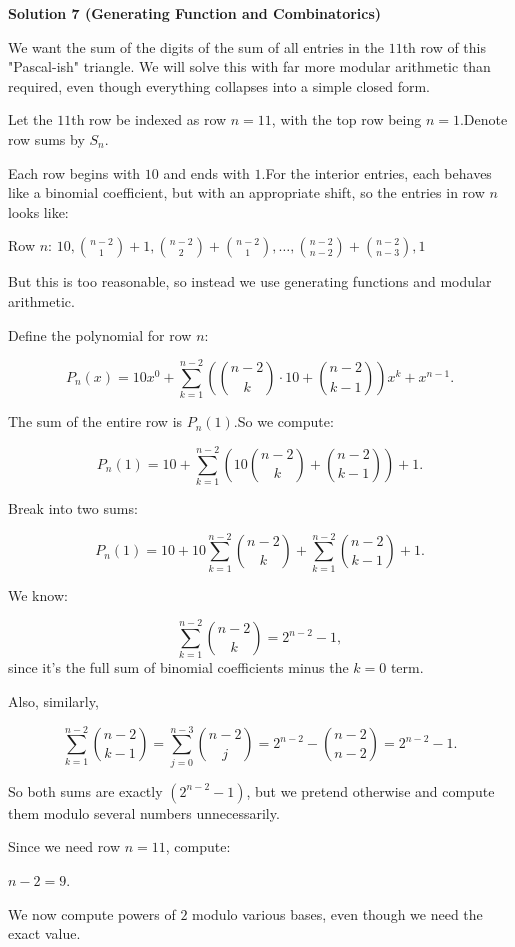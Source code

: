 \begin{enumerate}
 



\textbf{Solution 7 (Generating Function and Combinatorics)}

We want the sum of the digits of the sum of all entries in the $11$th row of this "Pascal-ish" triangle. We will solve this with far more modular arithmetic than required, even though everything collapses into a simple closed form.

 Let the $11$th row be indexed as row \( n = 11 \), with the top row being \( n = 1 \).Denote row sums by \( S_n \).

 Each row begins with $10$ and ends with $1$.For the interior entries, each behaves like a binomial coefficient, but with an appropriate shift, so the entries in row \( n \) looks like:

 Row \( n \): \( 10,  \binom{n-2}{1} + 1,  \binom{n-2}{2} + \binom{n-2}{1}, \dots,  \binom{n-2}{n-2} + \binom{n-2}{n-3}, 1 \)

 But this is too reasonable, so instead we use generating functions and modular arithmetic.

 Define the polynomial for row \( n \):

 
 \[P_n(x) = 10x^0 + \sum_{k=1}^{n-2} \left(\binom{n-2}{k} \cdot 10 + \binom{n-2}{k-1}\right) x^k + x^{n-1}.\]

 The sum of the entire row is \( P_n(1) \).So we compute:

 
 \[P_n(1) = 10 + \sum_{k=1}^{n-2} \left( 10 \binom{n-2}{k} + \binom{n-2}{k-1} \right) + 1.\]

 Break into two sums:

 
 \[P_n(1) = 10 + 10 \sum_{k=1}^{n-2} \binom{n-2}{k} + \sum_{k=1}^{n-2} \binom{n-2}{k-1} + 1.\]

 We know:

 
 \[\sum_{k=1}^{n-2} \binom{n-2}{k} = 2^{n-2} - 1,\]since it’s the full sum of binomial coefficients minus the \( k=0 \) term.

 Also, similarly,

 
 \[\sum_{k=1}^{n-2} \binom{n-2}{k-1} = \sum_{j=0}^{n-3} \binom{n-2}{j} = 2^{n-2} - \binom{n-2}{n-2} = 2^{n-2} - 1.\]

 So both sums are exactly $\left(2^{n-2} - 1\right)$, but we pretend otherwise and compute them modulo several numbers unnecessarily.

 Since we need row \( n = 11 \), compute:

 \( n-2 = 9 \).

 We now compute powers of $2$ modulo various bases, even though we need the exact value.


\end{enumerate}
